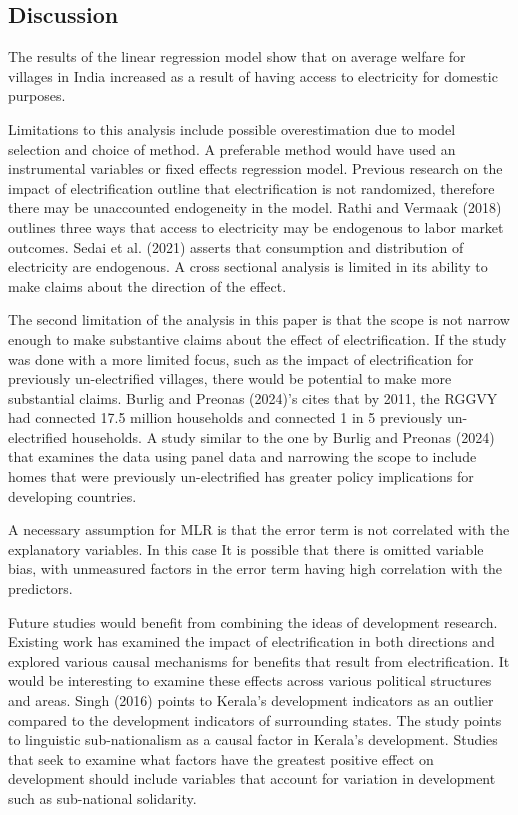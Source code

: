 \documentclass[
]{article}
\begin{document}
\hypertarget{discussion}{%
\subsection{Discussion}\label{discussion}}

The results of the linear regression model show that on average welfare
for villages in India increased as a result of having access to
electricity for domestic purposes.

Limitations to this analysis include possible overestimation due to
model selection and choice of method. A preferable method would have
used an instrumental variables or fixed effects regression model.
Previous research on the impact of electrification outline that
electrification is not randomized, therefore there may be unaccounted
endogeneity in the model. Rathi and Vermaak (2018) outlines three ways
that access to electricity may be endogenous to labor market outcomes.
Sedai et al. (2021) asserts that consumption and distribution of
electricity are endogenous. A cross sectional analysis is limited in its
ability to make claims about the direction of the effect.

The second limitation of the analysis in this paper is that the scope is
not narrow enough to make substantive claims about the effect of
electrification. If the study was done with a more limited focus, such
as the impact of electrification for previously un-electrified villages,
there would be potential to make more substantial claims. Burlig and
Preonas (2024)'s cites that by 2011, the RGGVY had connected 17.5
million households and connected 1 in 5 previously un-electrified
households. A study similar to the one by Burlig and Preonas (2024) that
examines the data using panel data and narrowing the scope to include
homes that were previously un-electrified has greater policy
implications for developing countries.

A necessary assumption for MLR is that the error term is not correlated
with the explanatory variables. In this case It is possible that there
is omitted variable bias, with unmeasured factors in the error term
having high correlation with the predictors.

Future studies would benefit from combining the ideas of development
research. Existing work has examined the impact of electrification in
both directions and explored various causal mechanisms for benefits that
result from electrification. It would be interesting to examine these
effects across various political structures and areas. Singh (2016)
points to Kerala's development indicators as an outlier compared to the
development indicators of surrounding states. The study points to
linguistic sub-nationalism as a causal factor in Kerala's development.
Studies that seek to examine what factors have the greatest positive
effect on development should include variables that account for
variation in development such as sub-national solidarity.
\end{document}
